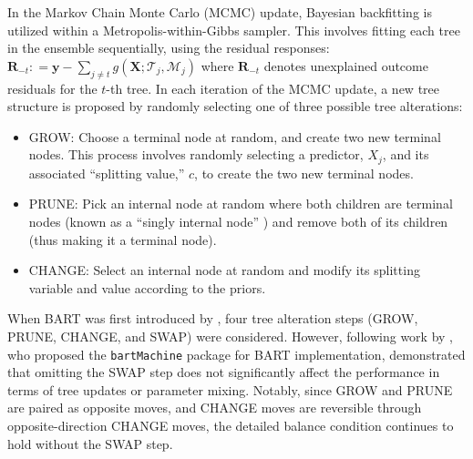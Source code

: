 In the Markov Chain Monte Carlo (MCMC) update, Bayesian backfitting\citep{hastie2000bayesian} is utilized within a Metropolis-within-Gibbs sampler. This involves fitting each tree in the ensemble sequentially, using the residual responses: $\mathbf{R}_{-t} : = \mathbf{y} - \sum_{j \neq t} g(\boldsymbol{X}; \mathcal{T}_j, \mathcal{M}_j)$ where $\mathbf{R}_{-t}$ denotes unexplained outcome residuals for the $t$-th tree. In each iteration of the MCMC update, a new tree structure is proposed by randomly selecting one of three possible tree alterations:
\begin{itemize}
\item[] GROW: Choose a terminal node at random, and create two new terminal nodes. This process involves randomly selecting a predictor, $X_j$, and its associated ``splitting value,'' $c$, to create the two new terminal nodes.
\item[] PRUNE: Pick an internal node at random where both children are terminal nodes (known as a ``singly internal node'' \citep{kapelner2013bartmachine}) and remove both of its children (thus making it a terminal node).
\item[] CHANGE: Select an internal node at random and modify its splitting variable and value according to the priors.
\end{itemize}
When BART was first introduced by \citet{chipman2010bart}, four tree alteration steps (GROW, PRUNE, CHANGE, and SWAP) were considered. However, following work by \citet{kapelner2013bartmachine}, who proposed the \verb|bartMachine| package for BART implementation, demonstrated that omitting the SWAP step does not significantly affect the performance in terms of tree updates or parameter mixing. Notably, since GROW and PRUNE are paired as opposite moves, and CHANGE moves are reversible through opposite-direction CHANGE moves, the detailed balance condition continues to hold without the SWAP step.
